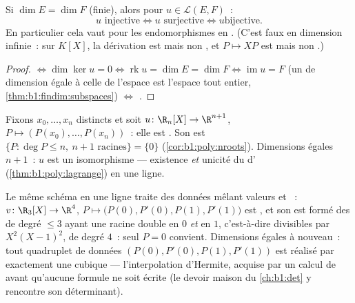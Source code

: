 \begin{corollary}\label{cor:b1:linmaps:samedim}
Si $\dim E = \dim F$ (finie), alors pour $u \in \mathcal{L}(E, F)$~:
\[
u \text{ injective} \iff u \text{ surjective} \iff u \text{
bijective}.
\]
En particulier cela vaut pour les endomorphismes en . (C'est
faux en dimension infinie~: sur $K[X]$, la dérivation est 
mais non , et $P \mapsto XP$ est  mais non
.)
\end{corollary}

\begin{proof}
 $\iff \dim\ker u = 0 \iff \operatorname{rk} u = \dim E =
\dim F \iff \operatorname{im} u = F$ (un  de dimension égale à
celle de l'espace est l'espace tout entier, \cref{thm:b1:findim:subspaces})
$\iff$ .
\end{proof}

\begin{example}\label{ex:b1:linmaps:interpolation}
Fixons $x_0, \dots, x_n$ distincts et soit $u \colon \R_n[X] \to
\R^{n+1}$, $P \mapsto (P(x_0), \dots, P(x_n))$~: elle est . Son 
est $\{P : \deg P \leq n,\ n+1 \text{ racines}\} = \{0\}$
(\cref{cor:b1:poly:nroots}). Dimensions égales $n + 1$~: $u$ est un
isomorphisme --- existence \emph{et} unicité du 
d' (\cref{thm:b1:poly:lagrange}) en une ligne.

Le même schéma en une ligne traite des données mêlant valeurs et
~: $v \colon \R_3[X] \to \R^4$, $P \mapsto \bigl(P(0),
P'(0), P(1), P'(1)\bigr)$ est , et son  est formé des
 de degré $\leq 3$ ayant une racine double en $0$ \emph{et} en
$1$, c'est-à-dire divisibles par $X^2(X-1)^2$, de degré $4$~: seul $P =
0$ convient. Dimensions égales à nouveau~: tout quadruplet de données $(P(0),
P'(0), P(1), P'(1))$ est réalisé par exactement une cubique ---
l'interpolation d'Hermite, acquise par un calcul de  avant
qu'aucune formule ne soit écrite (le devoir maison du \cref{ch:b1:det}
y rencontre son déterminant).
\end{example}

